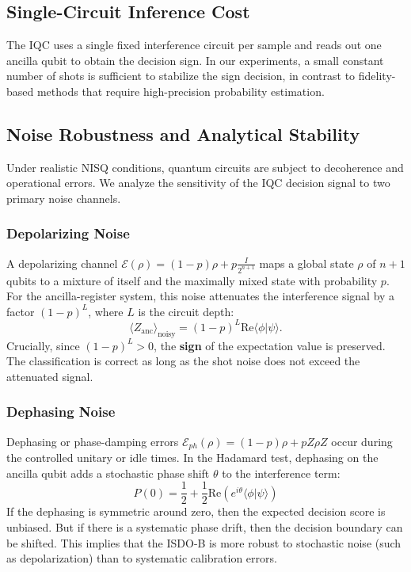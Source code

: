 \documentclass[conference]{IEEEtran}
\begin{document}
\subsection{Single-Circuit Inference Cost}

The IQC uses a single fixed interference circuit per sample and reads out one ancilla qubit to obtain the decision sign. In our experiments, a small constant number of shots is sufficient to stabilize the sign decision, in contrast to fidelity-based methods that require high-precision probability estimation.

\subsection{Noise Robustness and Analytical Stability}

Under realistic NISQ conditions, quantum circuits are subject to decoherence and operational errors. We analyze the sensitivity of the IQC decision signal to two primary noise channels.

\subsubsection{Depolarizing Noise}
A depolarizing channel $\mathcal{E}(\rho) = (1-p)\rho + p\frac{I}{2^{n+1}}$ maps a global state $\rho$ of $n+1$ qubits to a mixture of itself and the maximally mixed state with probability $p$. For the ancilla-register system, this noise attenuates the interference signal by a factor $(1-p)^L$, where $L$ is the circuit depth:
\begin{equation}
    \langle Z_{\text{anc}} \rangle_{\text{noisy}} = (1-p)^L \mathrm{Re}\langle \phi | \psi \rangle.
\end{equation}
Crucially, since $(1-p)^L > 0$, the \textbf{sign} of the expectation value is preserved. The classification is correct as long as the shot noise does not exceed the attenuated signal.

\subsubsection{Dephasing Noise}
Dephasing or phase-damping errors $\mathcal{E}_{ph}(\rho) = (1-p)\rho + p Z\rho Z$ occur during the controlled unitary or idle times. In the Hadamard test, dephasing on the ancilla qubit adds a stochastic phase shift $\theta$ to the interference term:
\begin{equation}
    P(0) = \frac{1}{2} + \frac{1}{2} \text{Re}(e^{i\theta} \langle \phi | \psi \rangle)
\end{equation}
If the dephasing is symmetric around zero, then the expected decision score is unbiased. But if there is a systematic phase drift, then the decision boundary can be shifted. This implies that the ISDO-B is more robust to stochastic noise (such as depolarization) than to systematic calibration errors.
\end{document}
